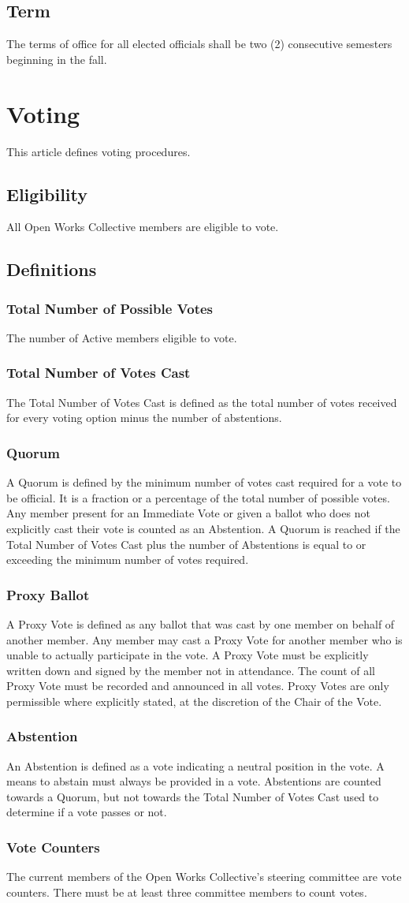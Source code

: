 \documentclass{article}
\newcommand{\article}[1]{\section{#1} \label{#1}}
\newcommand{\asection}[1]{\subsection{#1} \label{#1}}
\newcommand{\asubsection}[1]{\subsubsection{#1} \label{#1}}
\begin{document}
\asection{Term}
The terms of office for all elected officials shall be two (2) consecutive semesters beginning in the fall.

\newpage
%
%
\article{Voting}
This article defines voting procedures.
\asection{Eligibility}
All Open Works Collective members are eligible to vote.
\asection{Definitions}
\asubsection{Total Number of Possible Votes}
The number of Active members eligible to vote.
\asubsection{Total Number of Votes Cast}
The Total Number of Votes Cast is defined as the total number of votes received for every voting option minus the number of abstentions.
\asubsection{Quorum}
A Quorum is defined by the minimum number of votes cast required for a vote to be official.
It is a fraction or a percentage of the total number of possible votes.
Any member present for an Immediate Vote or given a ballot who does not explicitly cast their vote is counted as an Abstention.
A Quorum is reached if the Total Number of Votes Cast plus the number of Abstentions is equal to or exceeding the minimum number of votes required.
\asubsection{Proxy Ballot}
A Proxy Vote is defined as any ballot that was cast by one member on behalf of another member.
Any member may cast a Proxy Vote for another member who is unable to actually participate in the vote.
A Proxy Vote must be explicitly written down and signed by the member not in attendance.
The count of all Proxy Vote must be recorded and announced in all votes.
Proxy Votes are only permissible where explicitly stated, at the discretion of the Chair of the Vote.
\asubsection{Abstention}
An Abstention is defined as a vote indicating a neutral position in the vote.
A means to abstain must always be provided in a vote.
Abstentions are counted towards a Quorum, but not towards the Total Number of Votes Cast used to determine if a vote passes or not.
\asubsection{Vote Counters}
The current members of the Open Works Collective's steering committee are vote counters. There must be at least three committee members to count votes.

\end{document}

